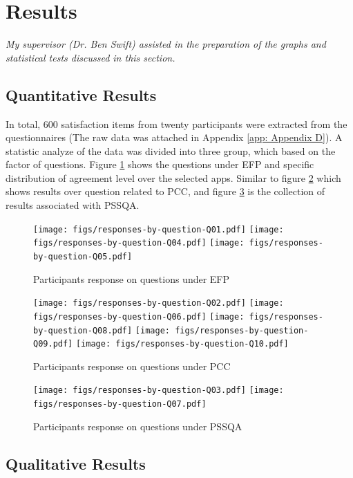 \section{Results}

\emph{My supervisor (Dr. Ben Swift) assisted in the preparation of the graphs
and statistical tests discussed in this section.}

\subsection{Quantitative Results}

In total, 600 satisfaction items from twenty participants were extracted from the questionnaires (The raw data was attached in Appendix \ref{app: Appendix D}). A statistic analyze of the data was divided into three group, which based on the factor of questions. Figure \ref{fig: result_EFP} shows the questions under EFP and specific distribution of agreement level over the selected apps. Similar to figure \ref{fig: result_PCC} which shows results over question related to PCC, and figure \ref{fig: result_PSSQA} is the collection of results associated with PSSQA.


\bigskip
\begin{figure}[h]
 \centering
 \texttt{[image: figs/responses-by-question-Q01.pdf]}
 \texttt{[image: figs/responses-by-question-Q04.pdf]}
 \texttt{[image: figs/responses-by-question-Q05.pdf]}
 \caption{Participants response on questions under EFP}
 \label{fig: result_EFP}
\end{figure}
\bigskip
\begin{figure}
 \centering
 \texttt{[image: figs/responses-by-question-Q02.pdf]}
 \texttt{[image: figs/responses-by-question-Q06.pdf]}
 \texttt{[image: figs/responses-by-question-Q08.pdf]}
 \texttt{[image: figs/responses-by-question-Q09.pdf]}
 \texttt{[image: figs/responses-by-question-Q10.pdf]}
 \caption{Participants response on questions under PCC}
 \label{fig: result_PCC}
\end{figure}

\begin{figure}[h]
 \centering
 \texttt{[image: figs/responses-by-question-Q03.pdf]}
 \texttt{[image: figs/responses-by-question-Q07.pdf]}
 \caption{Participants response on questions under PSSQA}
 \label{fig: result_PSSQA}
\end{figure}

\subsection{Qualitative Results}

